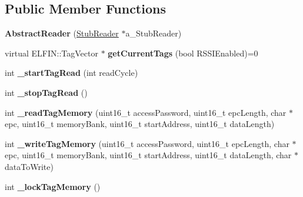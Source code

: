 \subsection*{Public Member Functions}
\begin{DoxyCompactItemize}
\item 
\hypertarget{class_e_l_f_i_n_1_1_abstract_reader_aa1be28f1bf872f36ccbb53b2dbb83ff5}{{\bfseries Abstract\-Reader} (\hyperlink{class_e_l_f_i_n_1_1_stub_reader}{Stub\-Reader} $\ast$a\-\_\-\-Stub\-Reader)}\label{class_e_l_f_i_n_1_1_abstract_reader_aa1be28f1bf872f36ccbb53b2dbb83ff5}

\item 
\hypertarget{class_e_l_f_i_n_1_1_abstract_reader_a8d7535f318d134739c081d745670b51b}{virtual E\-L\-F\-I\-N\-::\-Tag\-Vector $\ast$ {\bfseries get\-Current\-Tags} (bool R\-S\-S\-I\-Enabled)=0}\label{class_e_l_f_i_n_1_1_abstract_reader_a8d7535f318d134739c081d745670b51b}

\item 
\hypertarget{class_e_l_f_i_n_1_1_abstract_reader_a155474dd8622c3a87566c579d1bacedb}{int {\bfseries \-\_\-start\-Tag\-Read} (int read\-Cycle)}\label{class_e_l_f_i_n_1_1_abstract_reader_a155474dd8622c3a87566c579d1bacedb}

\item 
\hypertarget{class_e_l_f_i_n_1_1_abstract_reader_ab3da76dbe35618e6f8c8eb70b709df59}{int {\bfseries \-\_\-stop\-Tag\-Read} ()}\label{class_e_l_f_i_n_1_1_abstract_reader_ab3da76dbe35618e6f8c8eb70b709df59}

\item 
\hypertarget{class_e_l_f_i_n_1_1_abstract_reader_ac4dd47850c2ea685aec7f04acd14eb65}{int {\bfseries \-\_\-read\-Tag\-Memory} (uint16\-\_\-t access\-Password, uint16\-\_\-t epc\-Length, char $\ast$epc, uint16\-\_\-t memory\-Bank, uint16\-\_\-t start\-Address, uint16\-\_\-t data\-Length)}\label{class_e_l_f_i_n_1_1_abstract_reader_ac4dd47850c2ea685aec7f04acd14eb65}

\item 
\hypertarget{class_e_l_f_i_n_1_1_abstract_reader_a75b16c903f66dc0c697fbad503eecf72}{int {\bfseries \-\_\-write\-Tag\-Memory} (uint16\-\_\-t access\-Password, uint16\-\_\-t epc\-Length, char $\ast$epc, uint16\-\_\-t memory\-Bank, uint16\-\_\-t start\-Address, uint16\-\_\-t data\-Length, char $\ast$data\-To\-Write)}\label{class_e_l_f_i_n_1_1_abstract_reader_a75b16c903f66dc0c697fbad503eecf72}

\item 
\hypertarget{class_e_l_f_i_n_1_1_abstract_reader_a7de97c2cd661bbcb72a80da4d3d9b7d4}{int {\bfseries \-\_\-lock\-Tag\-Memory} ()}\label{class_e_l_f_i_n_1_1_abstract_reader_a7de97c2cd661bbcb72a80da4d3d9b7d4}


\end{DoxyCompactItemize}
